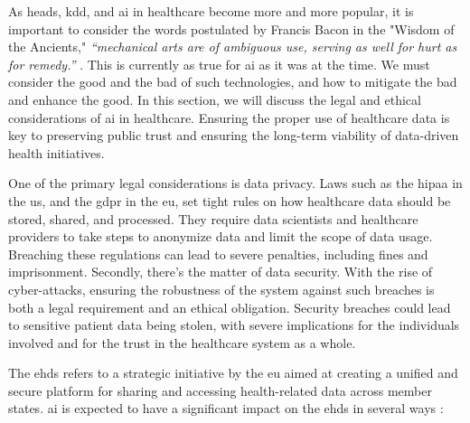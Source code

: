 
As \ac{heads}, \ac{kdd}, and \ac{ai} in healthcare become more and more popular, it is important to consider the words postulated by Francis Bacon in the "Wisdom of the Ancients," \textit{“mechanical arts are of ambiguous use, serving as well for hurt as for remedy.”} \cite{bacon_2011}. This is currently as true for \ac{ai} as it was at the time. We must consider the good and the bad of such technologies, and how to mitigate the bad and enhance the good. In this section, we will discuss the legal and ethical considerations of \ac{ai} in healthcare. Ensuring the proper use of healthcare data is key to preserving public trust and ensuring the long-term viability of data-driven health initiatives.


One of the primary legal considerations is data privacy. Laws such as the \ac{hipaa} in the \ac{us}, and the \ac{gdpr} in the \ac{eu}, set tight rules on how healthcare data should be stored, shared, and processed. They require data scientists and healthcare providers to take steps to anonymize data and limit the scope of data usage. Breaching these regulations can lead to severe penalties, including fines and imprisonment.
Secondly, there's the matter of data security. With the rise of cyber-attacks, ensuring the robustness of the system against such breaches is both a legal requirement and an ethical obligation. Security breaches could lead to sensitive patient data being stolen, with severe implications for the individuals involved and for the trust in the healthcare system as a whole.


The \ac{ehds} refers to a strategic initiative by the \ac{eu} aimed at creating a unified and secure platform for sharing and accessing health-related data across member states. \ac{ai} is expected to have a significant impact on the \ac{ehds} in several ways \cite{ehds}:

